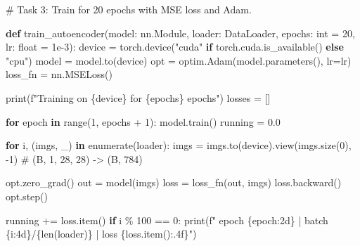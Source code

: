 \documentclass[
  letterpaper,
  DIV=11,
  numbers=noendperiod]{scrartcl}
\newenvironment{Shaded}{\begin{snugshade}}{\end{snugshade}}
\newcommand{\BuiltInTok}[1]{\textcolor[rgb]{0.00,0.23,0.31}{#1}}
\newcommand{\CommentTok}[1]{\textcolor[rgb]{0.37,0.37,0.37}{#1}}
\newcommand{\ControlFlowTok}[1]{\textcolor[rgb]{0.00,0.23,0.31}{\textbf{#1}}}
\newcommand{\DecValTok}[1]{\textcolor[rgb]{0.68,0.00,0.00}{#1}}
\newcommand{\FloatTok}[1]{\textcolor[rgb]{0.68,0.00,0.00}{#1}}
\newcommand{\KeywordTok}[1]{\textcolor[rgb]{0.00,0.23,0.31}{\textbf{#1}}}
\newcommand{\NormalTok}[1]{\textcolor[rgb]{0.00,0.23,0.31}{#1}}
\newcommand{\OperatorTok}[1]{\textcolor[rgb]{0.37,0.37,0.37}{#1}}
\newcommand{\SpecialCharTok}[1]{\textcolor[rgb]{0.37,0.37,0.37}{#1}}
\newcommand{\SpecialStringTok}[1]{\textcolor[rgb]{0.13,0.47,0.30}{#1}}
\newcommand{\StringTok}[1]{\textcolor[rgb]{0.13,0.47,0.30}{#1}}
\begin{document}
\begin{Shaded}
\begin{Highlighting}[]
\CommentTok{\# Task 3: Train for 20 epochs with MSE loss and Adam.}

\KeywordTok{def}\NormalTok{ train\_autoencoder(model: nn.Module, loader: DataLoader, epochs: }\BuiltInTok{int} \OperatorTok{=} \DecValTok{20}\NormalTok{, lr: }\BuiltInTok{float} \OperatorTok{=} \FloatTok{1e{-}3}\NormalTok{):}
\NormalTok{    device }\OperatorTok{=}\NormalTok{ torch.device(}\StringTok{"cuda"} \ControlFlowTok{if}\NormalTok{ torch.cuda.is\_available() }\ControlFlowTok{else} \StringTok{"cpu"}\NormalTok{)}
\NormalTok{    model }\OperatorTok{=}\NormalTok{ model.to(device)}
\NormalTok{    opt }\OperatorTok{=}\NormalTok{ optim.Adam(model.parameters(), lr}\OperatorTok{=}\NormalTok{lr)}
\NormalTok{    loss\_fn }\OperatorTok{=}\NormalTok{ nn.MSELoss()}

    \BuiltInTok{print}\NormalTok{(}\SpecialStringTok{f"Training on }\SpecialCharTok{\{}\NormalTok{device}\SpecialCharTok{\}}\SpecialStringTok{ for }\SpecialCharTok{\{}\NormalTok{epochs}\SpecialCharTok{\}}\SpecialStringTok{ epochs"}\NormalTok{)}
\NormalTok{    losses }\OperatorTok{=}\NormalTok{ []}

    \ControlFlowTok{for}\NormalTok{ epoch }\KeywordTok{in} \BuiltInTok{range}\NormalTok{(}\DecValTok{1}\NormalTok{, epochs }\OperatorTok{+} \DecValTok{1}\NormalTok{):}
\NormalTok{        model.train()}
\NormalTok{        running }\OperatorTok{=} \FloatTok{0.0}

        \ControlFlowTok{for}\NormalTok{ i, (imgs, \_) }\KeywordTok{in} \BuiltInTok{enumerate}\NormalTok{(loader):}
\NormalTok{            imgs }\OperatorTok{=}\NormalTok{ imgs.to(device).view(imgs.size(}\DecValTok{0}\NormalTok{), }\OperatorTok{{-}}\DecValTok{1}\NormalTok{)   }\CommentTok{\# (B, 1, 28, 28) {-}\textgreater{} (B, 784)}

\NormalTok{            opt.zero\_grad()}
\NormalTok{            out }\OperatorTok{=}\NormalTok{ model(imgs)}
\NormalTok{            loss }\OperatorTok{=}\NormalTok{ loss\_fn(out, imgs)}
\NormalTok{            loss.backward()}
\NormalTok{            opt.step()}

\NormalTok{            running }\OperatorTok{+=}\NormalTok{ loss.item()}
            \ControlFlowTok{if}\NormalTok{ i }\OperatorTok{\%} \DecValTok{100} \OperatorTok{==} \DecValTok{0}\NormalTok{:}
                \BuiltInTok{print}\NormalTok{(}\SpecialStringTok{f"  epoch }\SpecialCharTok{\{}\NormalTok{epoch}\SpecialCharTok{:2d\}}\SpecialStringTok{ | batch }\SpecialCharTok{\{}\NormalTok{i}\SpecialCharTok{:4d\}}\SpecialStringTok{/}\SpecialCharTok{\{}\BuiltInTok{len}\NormalTok{(loader)}\SpecialCharTok{\}}\SpecialStringTok{ | loss }\SpecialCharTok{\{}\NormalTok{loss}\SpecialCharTok{.}\NormalTok{item()}\SpecialCharTok{:.4f\}}\SpecialStringTok{"}\NormalTok{)}


\end{Highlighting}
\end{Shaded}
\end{document}
